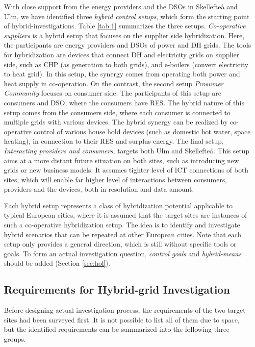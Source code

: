 \documentclass[a4paper,twoside]{article}
\begin{document}
With close support from the energy providers and the DSOs 
in Skellefte{\aa} and Ulm, we have identified three {\em hybrid
  control setups}, which form the starting point of
hybrid-investigations.    
Table \ref{tab:1} summarizes the three setups. {\em Co-operative
  suppliers} is a hybrid setup that focuses on the supplier side
hybridization. Here, the participants are energy providers and DSOs of  
power and DH grids. The tools for hybridization are devices that
connect DH and electricity grids on supplier side,
such as CHP (as generation to both grids), and e-boilers (convert
electricity to heat grid). In this setup, the synergy comes from
operating both power and heat supply in co-operation. 
On the contrast, the second setup {\em Prosumer Community} focuses on
consumer side. The participants of this setup are consumers and DSO,
where the consumers have RES. The hybrid nature of this setup comes
from the consumers side, where each consumer is connected to multiple
grids with various devices. The hybrid synergy can be realized by
co-operative control of various house hold devices (such as domestic
hot water, space heating), in connection to their RES and surplus
energy. 
The final setup, {\em Interacting providers and consumers}, targets
both Ulm and Skellefte{\aa}. This setup aims at a more distant future
situation on both sites, such as introducing new grids or new business
models. It assumes tighter level of ICT connections of both sites,
which will enable far higher level of interactions between consumers,
providers and the devices, both in resolution and data amount.   

Each hybrid setup represents a class of hybridization potential
applicable to typical European cities, where it is assumed that the
target sites are instances of such a co-operative hybridization setup. 
The idea is to identify and investigate hybrid scenarios that can be
repeated at other European cities. Note that each setup only provides
a general direction, which is still without specific tools or
goals. To form an actual investigation question,  {\em control
  goals} and {\em hybrid-means} should be added (Section
\ref{sec:hol}). 

\subsection{Requirements for Hybrid-grid Investigation}
\label{sec:req-2}
Before designing actual investigation process, the requirements of the
two target sites had been surveyed first. 
It is not possible to list all of them due to space, but the
identified requirements can be summarized into the following three
groups.  
\end{document}
